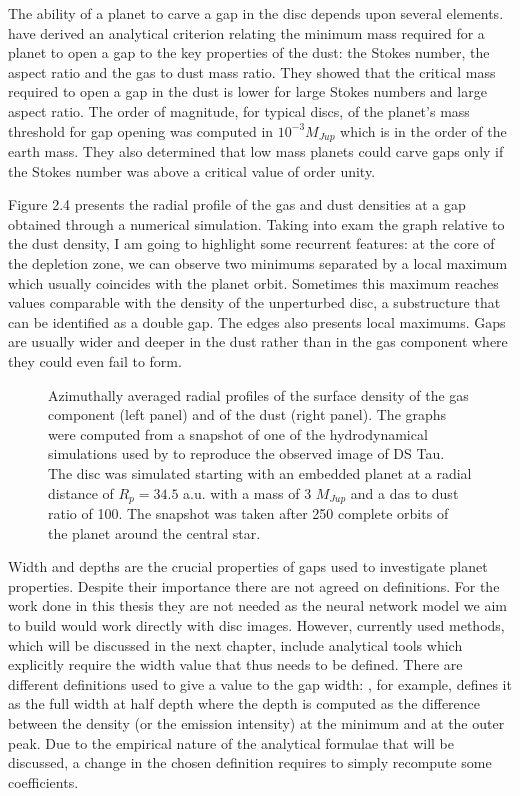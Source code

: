 \documentclass[a4paper,10pt]{report}
\begin{document}
The ability of a planet to carve a gap in the disc depends upon several elements. 
\citet{Dipierro_2017} have derived an analytical criterion relating the minimum mass required for a planet
to open a gap to the key properties of the dust: the Stokes number, the aspect ratio and the gas to dust mass ratio.
They showed that the critical mass required to open a gap in the dust is lower for large Stokes numbers
and large aspect ratio.
The order of magnitude, for typical discs, of the planet's mass threshold for gap opening was computed in $10^{-3}M_{Jup}$
which is in the order of the earth mass. They also determined that low mass planets could carve gaps only if the
Stokes number was above a critical value of order unity.

Figure 2.4 presents the radial profile of the gas and dust densities at a gap obtained through a numerical simulation. Taking into exam 
the graph relative to the dust density, I am going to highlight some recurrent features:
at the core of the depletion zone, we can observe two minimums separated by a local maximum which usually coincides with the planet orbit.
Sometimes this maximum reaches values comparable with the density of the unperturbed disc, a substructure that can be identified as a double gap. 
The edges also presents local maximums. Gaps are usually wider and deeper in the dust rather than in the gas component where they could even
fail to form.

\begin{figure}
    \begin{center}
        
    \end{center}
    \caption{Azimuthally averaged radial profiles of the surface density of the gas component (left panel)
    and of the dust (right panel). The graphs were computed from a snapshot of one of the hydrodynamical
    simulations used by \citet{dstauv} to reproduce the observed image of DS Tau.
    The disc was simulated starting with an embedded planet at a radial distance of $R_p = 34.5$ a.u. with a mass of 3 $M_{Jup}$ and a das to dust ratio of 100.
    The snapshot was taken after 250 complete orbits of the planet around the central star.
    }
\end{figure}

Width and depths are the crucial properties of gaps used to investigate planet properties. Despite their importance there are not agreed on definitions.
For the work done in this thesis they are not needed as the neural network model we aim to build would work directly with disc images.
However, currently used methods, which will be discussed in the next chapter, include analytical tools which explicitly require the width
value that thus needs to be defined.
There are different definitions used to give a value to the gap width: \citet{Long_2018}, for example, defines it as the full width at half depth where 
the depth is computed as the difference between the density (or the emission intensity) at the minimum and at the outer peak.
Due to the empirical nature of the analytical formulae that will be discussed, a change in the chosen definition requires to simply recompute
some coefficients.                                        
\end{document}
